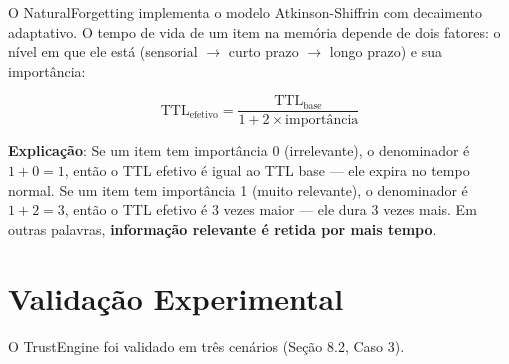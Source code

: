 
O NaturalForgetting implementa o modelo Atkinson-Shiffrin com decaimento adaptativo. O tempo de vida de um item na memória depende de dois fatores: o nível em que ele está (sensorial $\rightarrow$ curto prazo $\rightarrow$ longo prazo) e sua importância:

\begin{equation}
\text{TTL}_{\text{efetivo}} = \frac{\text{TTL}_{\text{base}}}{1 + 2 \times \text{importância}}
\label{eq:ttl}
\end{equation}

\textbf{Explicação}: Se um item tem importância 0 (irrelevante), o denominador é $1 + 0 = 1$, então o TTL efetivo é igual ao TTL base — ele expira no tempo normal. Se um item tem importância 1 (muito relevante), o denominador é $1 + 2 = 3$, então o TTL efetivo é 3 vezes maior — ele dura 3 vezes mais. Em outras palavras, \textbf{informação relevante é retida por mais tempo}.

\section{Validação Experimental}

O TrustEngine foi validado em três cenários (Seção 8.2, Caso 3). 
